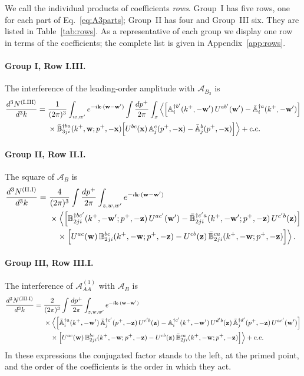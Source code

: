 We call the individual products of coefficients \emph{rows}. Group~I has five rows, one for each part of Eq.~\eqref{eq:A3parts}; Group~II has four and Group~III six. They are listed in Table~\ref{tab:rows}. As a representative of each group we display one row in terms of the coefficients; the complete list is given in Appendix~\ref{app:rows}.

\paragraph{Group I, Row I.III.} The interference of the leading-order amplitude with $\mathcal A_{B_3}$ is
\begin{align}\label{eq:rowI_III}
\frac{d^3N^{\rm(I.III)}}{d^3k}=\ &\frac{1}{(2\pi)^3}\int_{w,w'}e^{-i\v k\cdot(\v w-\v w')}\int\frac{dp^+}{2\pi}\int_x\Big\langle\Big[\mf A^{\dagger b'}_i(k^+,-\v w')\,U^{ab'}(\v w')-\bar{\mf A}^{\dagger a}_i(k^+,-\v w')\Big]\notag\\
&\times\bar{\mf B}^{\dagger ba}_{3ji}(k^+,\v w;p^+,-\v x)\Big[U^{bc}(\v x)\,\mf A^c_j(p^+,-\v x)-\bar{\mf A}^b_j(p^+,-\v x)\Big]\Big\rangle+{\rm c.c.}
\end{align}

\paragraph{Group II, Row II.I.} The square of $\mathcal A_B$ is
\begin{align}\label{eq:rowII_I}
\frac{d^3N^{\rm(II.I)}}{d^3k}=\ &\frac{4}{(2\pi)^3}\int\frac{dp^+}{2\pi}\int_{z,w,w'}e^{-i\v k\cdot(\v w-\v w')}\notag\\
&\times\Big\langle\Big[\mf B^{\dagger bc'}_{2ji}(k^+,-\v w';p^+,-\v z)\,U^{ac'}(\v w')-\bar{\mf B}^{\dagger c'a}_{2ji}(k^+,-\v w';p^+,-\v z)\,U^{c'b}(\v z)\Big]\notag\\
&\quad\times\Big[U^{ac}(\v w)\,\mf B^{bc}_{2ji}(k^+,-\v w;p^+,-\v z)-U^{cb}(\v z)\,\bar{\mf B}^{ca}_{2ji}(k^+,-\v w;p^+,-\v z)\Big]\Big\rangle\,.
\end{align}

\paragraph{Group III, Row III.I.} The interference of $\mathcal A^{(1)}_{AA}$ with $\mathcal A_B$ is
\begin{align}\label{eq:rowIII_I}
\frac{d^3N^{\rm(III.I)}}{d^3k}=\ &\frac{2}{(2\pi)^3}\int\frac{dp^+}{2\pi}\int_{z,w,w'}e^{-i\v k\cdot(\v w-\v w')}\notag\\
&\times\Big\langle\Big[\bar{\mf A}^{\dagger a}_i(k^+,-\v w')\,\bar{\mf A}^{\dagger c'}_j(p^+,-\v z)\,U^{c'b}(\v z)-\mf A^{\dagger c'}_i(k^+,-\v w')\,U^{d'b}(\v z)\,\bar{\mf A}^{\dagger d'}_j(p^+,-\v z)\,U^{ac'}(\v w')\Big]\notag\\
&\quad\times\Big[U^{ac}(\v w)\,\mf B^{bc}_{2ji}(k^+,-\v w;p^+,-\v z)-U^{cb}(\v z)\,\bar{\mf B}^{ca}_{2ji}(k^+,-\v w;p^+,-\v z)\Big]\Big\rangle+{\rm c.c.}
\end{align}
In these expressions the conjugated factor stands to the left, at the primed point, and the order of the coefficients is the order in which they act.

